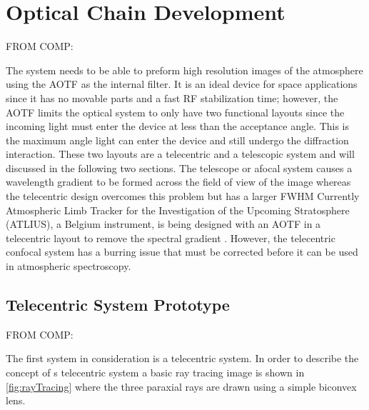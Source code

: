 \section{Optical Chain Development}

FROM COMP:

The system needs to be able to preform high resolution images of the atmosphere using the AOTF as the internal filter. It is an ideal device for space applications since it has no movable parts and a fast RF stabilization time; however, the AOTF limits the optical system to only have two functional layouts since the incoming light must enter the device at less than the acceptance angle. This is the maximum angle light can enter the device and still undergo the diffraction interaction. These two layouts are a telecentric and a telescopic system and will discussed in the following two sections. The telescope or afocal system causes a wavelength gradient to be formed across the field of view of the image whereas the telecentric design overcomes this problem but has a larger FWHM \citep{Suhre2004} Currently Atmospheric Limb Tracker for the Investigation of the Upcoming Stratosphere (ATLIUS), a Belgium instrument, is being designed with an AOTF in a telecentric layout to remove the spectral gradient \citep{Dekemper2012}. However, the telecentric confocal system has a burring issue that must be corrected before it can be used in atmospheric spectroscopy.

\subsection{Telecentric System Prototype}

FROM COMP:

The first system in consideration is a telecentric system. In order to describe the concept of s telecentric system a basic ray tracing image is shown in \autoref{fig:rayTracing} where the three paraxial rays are drawn using a simple biconvex lens. %

